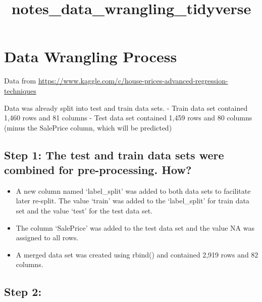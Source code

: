 \documentclass[
]{article}
\title{notes\_data\_wrangling\_tidyverse}
\author{}
\date{\vspace{-2.5em}}
\providecommand{\tightlist}{%
  \setlength{\itemsep}{0pt}\setlength{\parskip}{0pt}}
\begin{document}
\maketitle

\hypertarget{data-wrangling-process}{%
\section{Data Wrangling Process}\label{data-wrangling-process}}

Data from
\url{https://www.kaggle.com/c/house-prices-advanced-regression-techniques}

Data was already split into test and train data sets. - Train data set
contained 1,460 rows and 81 columns - Test data set contained 1,459 rows
and 80 columns (minus the SalePrice column, which will be predicted)

\hypertarget{step-1-the-test-and-train-data-sets-were-combined-for-pre-processing.-how}{%
\subsection{Step 1: The test and train data sets were combined for
pre-processing.
How?}\label{step-1-the-test-and-train-data-sets-were-combined-for-pre-processing.-how}}

\begin{itemize}
\tightlist
\item
  A new column named `label\_split' was added to both data sets to
  facilitate later re-split. The value `train' was added to the
  `label\_split' for train data set and the value `test' for the test
  data set.
\item
  The column `SalePrice' was added to the test data set and the value NA
  was assigned to all rows.
\item
  A merged data set was created using rbind() and contained 2,919 rows
  and 82 columns.
\end{itemize}

\hypertarget{step-2}{%
\subsection{Step 2:}\label{step-2}}
\end{document}
